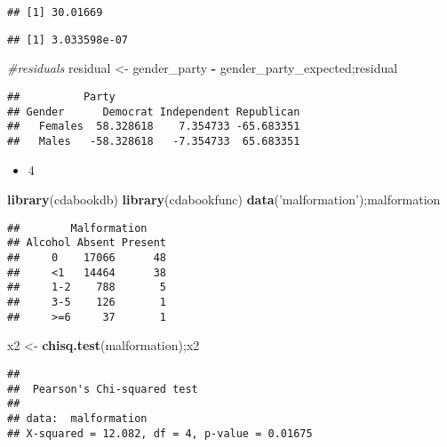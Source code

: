 \documentclass[12pt,hyperref,]{ctexart}
\newenvironment{Shaded}{\begin{snugshade}}{\end{snugshade}}
\newcommand{\CommentTok}[1]{\textcolor[rgb]{0.56,0.35,0.01}{\textit{#1}}}
\newcommand{\KeywordTok}[1]{\textcolor[rgb]{0.13,0.29,0.53}{\textbf{#1}}}
\newcommand{\NormalTok}[1]{#1}
\newcommand{\OperatorTok}[1]{\textcolor[rgb]{0.81,0.36,0.00}{\textbf{#1}}}
\newcommand{\StringTok}[1]{\textcolor[rgb]{0.31,0.60,0.02}{#1}}
\providecommand{\tightlist}{%
  \setlength{\itemsep}{0pt}\setlength{\parskip}{0pt}}
\begin{document}
\begin{verbatim}
## [1] 30.01669
\end{verbatim}

\begin{verbatim}
## [1] 3.033598e-07
\end{verbatim}

\begin{Shaded}
\begin{Highlighting}[]
\CommentTok{#residuals}
\NormalTok{residual <-}\StringTok{ }\NormalTok{gender_party }\OperatorTok{-}\StringTok{ }\NormalTok{gender_party_expected;residual}
\end{Highlighting}
\end{Shaded}

\begin{verbatim}
##          Party
## Gender      Democrat Independent Republican
##   Females  58.328618    7.354733 -65.683351
##   Males   -58.328618   -7.354733  65.683351
\end{verbatim}

\begin{itemize}
\tightlist
\item
  4
\end{itemize}

\begin{Shaded}
\begin{Highlighting}[]
\KeywordTok{library}\NormalTok{(cdabookdb)}
\KeywordTok{library}\NormalTok{(cdabookfunc)}
\KeywordTok{data}\NormalTok{(}\StringTok{'malformation'}\NormalTok{);malformation}
\end{Highlighting}
\end{Shaded}

\begin{verbatim}
##        Malformation
## Alcohol Absent Present
##     0    17066      48
##     <1   14464      38
##     1-2    788       5
##     3-5    126       1
##     >=6     37       1
\end{verbatim}

\begin{Shaded}
\begin{Highlighting}[]
\NormalTok{x2 <-}\StringTok{ }\KeywordTok{chisq.test}\NormalTok{(malformation);x2}
\end{Highlighting}
\end{Shaded}

\begin{verbatim}
## 
##  Pearson's Chi-squared test
## 
## data:  malformation
## X-squared = 12.082, df = 4, p-value = 0.01675
\end{verbatim}
\end{document}
